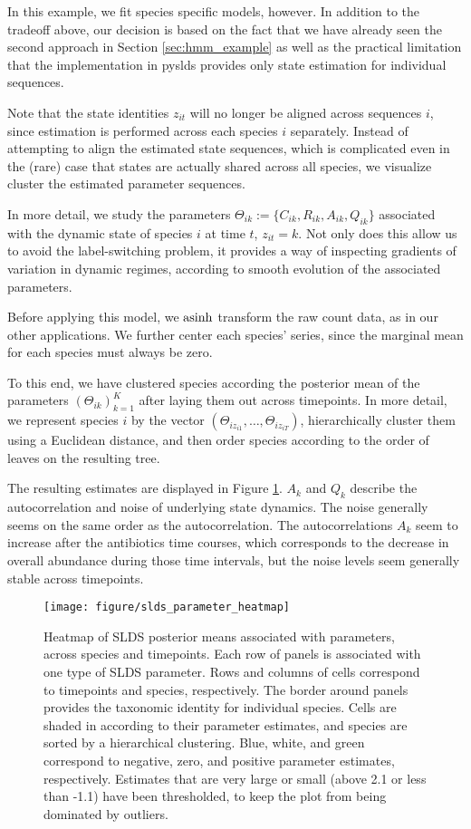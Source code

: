 \documentclass[14pt]{extreport}
\begin{document}
In this example, we fit species specific models, however. In addition to the
tradeoff above, our decision is based on the fact that we have already seen the
second approach in Section \ref{sec:hmm_example} as well as the practical
limitation that the implementation in pyslds provides only state estimation for
individual sequences.

Note that the state identities $z_{it}$ will no longer be aligned across
sequences $i$, since estimation is performed across each species $i$ separately.
Instead of attempting to align the estimated state sequences, which is
complicated even in the (rare) case that states are actually shared across all
species, we visualize cluster the estimated parameter sequences.

In more detail, we study the parameters $\Theta_{ik} := \{C_{ik}, R_{ik},
A_{ik}, Q_{ik}\}$ associated with the dynamic state of species $i$ at time $t$,
$z_{it} = k$. Not only does this allow us to avoid the label-switching problem,
it provides a way of inspecting gradients of variation in dynamic regimes,
according to smooth evolution of the associated parameters.

Before applying this model, we $\mathop\mathrm{asinh}$ transform the raw count data, as in our
other applications. We further center each species' series, since the marginal
mean for each species must always be zero.

To this end, we have clustered species according the posterior mean of the
parameters $\left(\Theta_{ik}\right)_{k =1}^{K}$ after laying them out across
timepoints. In more detail, we represent species $i$ by the vector
$\left(\Theta_{i z_{i1}}, \dots, \Theta_{i z_{iT}}\right)$, hierarchically
  cluster them using a Euclidean distance, and then order species according to
  the order of leaves on the resulting tree.

The resulting estimates are displayed in Figure
\ref{fig:slds_parameter_heatmap}. $A_k$ and $Q_k$ describe the autocorrelation
and noise of underlying state dynamics. The noise generally seems on the same
order as the autocorrelation. The autocorrelations $A_{k}$ seem to increase
after the antibiotics time courses, which corresponds to the decrease in overall
abundance during those time intervals, but the noise levels seem generally
stable across timepoints.

\begin{figure}
  \centering
  \texttt{[image: figure/slds\_parameter\_heatmap]}
  \caption{Heatmap of SLDS posterior means associated with parameters, across
    species and timepoints. Each row of panels is associated with one type of
    SLDS parameter. Rows and columns of cells correspond to timepoints and
    species, respectively. The border around panels provides the taxonomic
    identity for individual species. Cells are shaded in according to their
    parameter estimates, and species are sorted by a hierarchical clustering.
    Blue, white, and green correspond to negative, zero, and positive parameter
    estimates, respectively. Estimates that are very large or small (above 2.1
    or less than -1.1) have been thresholded, to keep the plot from being
    dominated by outliers. \label{fig:slds_parameter_heatmap}
  }
\end{figure}
\end{document}
